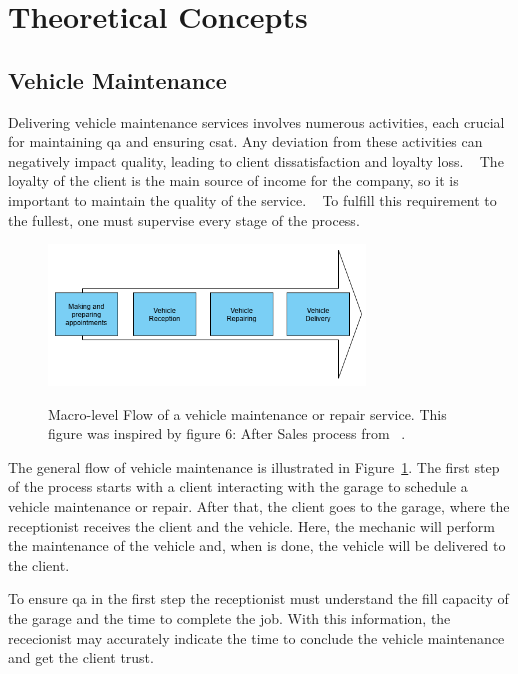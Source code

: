 \section{Theoretical Concepts}

\subsection{Vehicle Maintenance}

Delivering vehicle maintenance services involves numerous activities, each crucial for maintaining \ac{qa} and ensuring \ac{csat}. 
Any deviation from these activities can negatively impact quality, leading to client dissatisfaction and loyalty loss. ~\cite{Setting_the_after_sale_process, Famiyeh_2018, Akuntansi_2022} 
The loyalty of the client is the main source of income for the company, so it is important to maintain the quality of the service. ~\cite{Setting_the_after_sale_process}
To fulfill this requirement to the fullest, one must supervise every stage of the process. ~\cite{Setting_the_after_sale_process}


\begin{figure}[h]
  \caption{Macro-level Flow of a vehicle maintenance or repair service. This figure was inspired by figure 6: After Sales process from ~\citet{Setting_the_after_sale_process}.}
  \centering
  \includegraphics[width=0.75\textwidth]{figs/Vehicle_maintenace_macro}
  \label{fig:Vehicle_maintenace_macro}
\end{figure}

The general flow of vehicle maintenance is illustrated in Figure~\ref{fig:Vehicle_maintenace_macro}. 
The first step of the process starts with a client interacting with the garage to schedule a vehicle maintenance or repair. 
After that, the client goes to the garage, where the receptionist receives the client and the vehicle.
Here, the mechanic will perform the maintenance of the vehicle and, when is done, the vehicle will be delivered to the client.

To ensure \ac{qa} in the first step the receptionist must understand the fill capacity of the garage and the time to complete the job. 
With this information, the rececionist may accurately indicate the time to conclude the vehicle maintenance and get the client trust. ~\cite{Setting_the_after_sale_process}

